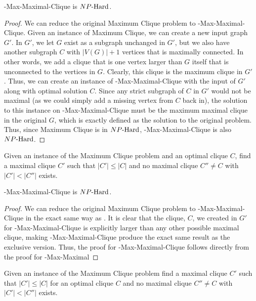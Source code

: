 \begin{theorem}
\exob{}-Max-Maximal-Clique is ${NP\text{-Hard{}}}$.
\end{theorem}
\begin{proof}
We can reduce the original Maximum Clique problem to \exob{}-Max-Maximal-Clique. Given an instance of Maximum Clique, we can create a new input graph $G'$. In $G'$, we let $G$ exist as a subgraph unchanged in $G'$, but we also have another subgraph $C$ with $|V(G)| + 1$ vertices that is maximally connected. In other words, we add a clique that is one vertex larger than $G$ itself that is unconnected to the vertices in $G$. Clearly, this clique is the maximum clique in $G'$. Thus, we can create an instance of \exob{}-Max-Maximal-Clique with the input of $G'$ along with optimal solution $C$. Since any strict subgraph of $C$ in $G'$ would not be maximal (as we could simply add a missing vertex from $C$ back in), the solution to this instance on \exob{}-Max-Maximal-Clique must be the maximum maximal clique in the original $G$, which is exactly defined as the solution to the original problem. Thus, since Maximum Clique is in ${NP\text{-Hard{}}}$, \exob{}-Max-Maximal-Clique is also ${NP\text{-Hard{}}}$.
\end{proof}

\begin{definition}
Given an instance of the Maximum Clique problem and an optimal clique $C$, find a maximal clique $C'$ such that $|C'| \leq |C|$ and no maximal clique $C'' \neq C$ with $|C'| < |C''|$ exists.
\end{definition}

\begin{theorem}
\inob{}-Max-Maximal-Clique is ${NP\text{-Hard{}}}$.
\end{theorem}
\begin{proof}
We can reduce the original Maximum Clique problem to \inob{}-Max-Maximal-Clique in the exact same way as \exob{}. It is clear that the clique, $C$, we created in $G'$ for \exob{}-Max-Maximal-Clique is explicitly larger than any other possible maximal clique, making \inob{}-Max-Maximal-Clique produce the exact same result as the exclusive version. Thus, the proof for \inob{}-Max-Maximal-Clique follows directly from the proof for \exob{}-Max-Maximal
\end{proof}

\begin{definition}
Given an instance of the Maximum Clique problem find a maximal clique $C'$ such that $|C'| \leq |C|$ for an optimal clique $C$ and no maximal clique $C'' \neq C$ with $|C'| < |C''|$ exists.
\end{definition}

